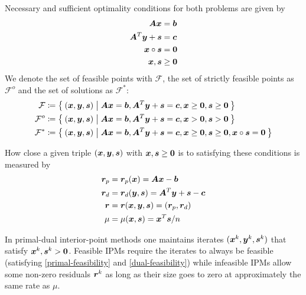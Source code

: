 Necessary and sufficient optimality conditions for both problems are given by
\begin{subequations}\label{optimality-conditions}
  \begin{align}
    \bm{A} \bm{x} &= \bm{b} \label{primal-feasibility} \\
    \bm{A}^T \bm{y} + \bm{s} &= \bm{c} \label{dual-feasibility} \\
    \bm{x} \circ \bm{s} &= \bm{0} \label{complementarity} \\
    \bm{x}, \bm{s} &\geq \bm{0} \label{nonnegativity}
  \end{align}
\end{subequations}
We denote the set of feasible points with \(\mathcal{F}\), the set of strictly feasible points as \(\mathcal{F}^o\) and the set of solutions as \(\mathcal{F}^*\):
\begin{align}
  \mathcal{F} &\coloneqq \Set{ (\bm{x}, \bm{y}, \bm{s}) | \bm{A}\bm{x} = \bm{b}, \bm{A}^T \bm{y} + \bm{s} = \bm{c}, \bm{x} \geq \bm{0}, \bm{s} \geq \bm{0}} \\
  \mathcal{F}^o &\coloneqq \Set{ (\bm{x}, \bm{y}, \bm{s}) | \bm{A}\bm{x} = \bm{b}, \bm{A}^T \bm{y} + \bm{s} = \bm{c}, \bm{x} > \bm{0}, \bm{s} > \bm{0}} \\
  \mathcal{F}^* &\coloneqq \Set{ (\bm{x}, \bm{y}, \bm{s}) | \bm{A}\bm{x} = \bm{b}, \bm{A}^T \bm{y} + \bm{s} = \bm{c}, \bm{x} \geq \bm{0}, \bm{s} \geq \bm{0}, \bm{x} \circ \bm{s} = \bm{0}}
\end{align}

How close a given triple \((\bm{x}, \bm{y}, \bm{s})\) with \(\bm{x}, \bm{s} \geq \bm{0}\) is to satisfying these conditions is measured by
\begin{subequations}
  \begin{align}
    \bm{r}_p &= \bm{r}_p(\bm{x}) = \bm{A}\bm{x} - \bm{b} \\
    \bm{r}_d &= \bm{r}_d(\bm{y}, \bm{s}) = \bm{A}^T \bm{y} + \bm{s} - \bm{c} \\
    \bm{r}   &= \bm{r}(\bm{x}, \bm{y}, \bm{s}) = (\bm{r}_p, \bm{r}_d) \\
    \mu       &= \mu(\bm{x}, \bm{s}) = \bm{x}^T \bm{s} / n
  \end{align}
\end{subequations}

In primal-dual interior-point methods one maintains iterates \((\bm{x}^k, \bm{y}^k, \bm{s}^k)\) that satisfy \(\bm{x}^k, \bm{s}^k > \bm{0}\).
Feasible IPMs require the iterates to always be feasible (satisfying \cref{primal-feasibility} and \cref{dual-feasibility}) while infeasible IPMs allow some non-zero residuals \(\bm{r}^k\) as long as their size goes to zero at approximately the same rate as \(\mu\).

